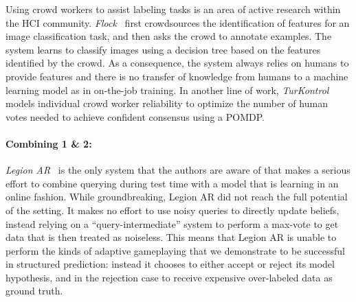 Using crowd workers to assist labeling tasks is an area of active research within the HCI community.
\textit{Flock}~\cite{cheng2015flock} first crowdsources the identification of features for an image classification task, and then asks the crowd to annotate examples.
The system learns to classify images using a decision tree based on the features identified by the crowd.
As a consequence, the system always relies on humans to provide features and there is no transfer of knowledge from humans to a machine learning model as in on-the-job training.
In another line of work, \textit{TurKontrol}~\cite{dai2010decision} models individual crowd worker reliability to optimize the number of human votes needed to achieve confident consensus using a POMDP\@.

\paragraph{Combining 1 \& 2:}

\textit{Legion AR}~\cite{lasecki2013real} is the only system that the authors are aware of that makes a serious effort to combine querying during test time with a model that is learning in an online fashion. While groundbreaking, Legion AR did not reach the full potential of the setting. It makes no effort to use noisy queries to directly update beliefs, instead relying on a ``query-intermediate'' system to perform a max-vote to get data that is then treated as noiseless. This means that Legion AR is unable to perform the kinds of adaptive gameplaying that we demonstrate to be successful in structured prediction: instead it chooses to either accept or reject its model hypothesis, and in the rejection case to receive expensive over-labeled data as ground truth.




